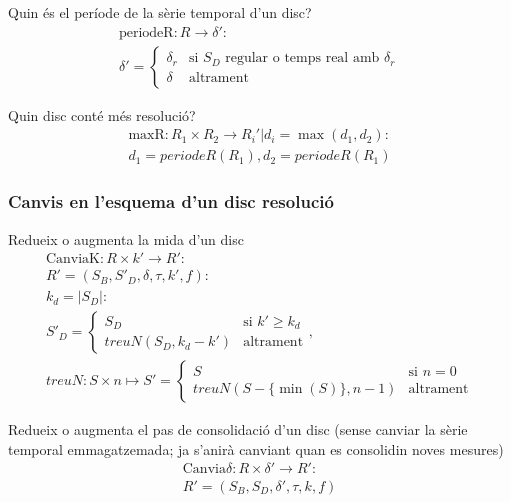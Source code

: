 Quin és el període de la sèrie temporal d'un disc?
  \begin{gather*}
    \text{periodeR}: R \longrightarrow \delta':\\
    \delta'=
    \begin{cases}
      \delta_r &\text{si } S_D \text{ regular o temps real amb } \delta_r\\
      \delta &\text{altrament}
    \end{cases}
  \end{gather*}


Quin disc conté més resolució?
  \begin{gather*}
    \text{maxR}: R_1 \times R_2 \longrightarrow R_i' | d_i = \max(d_1,d_2) : \\
    d_1 = periodeR(R_1), d_2 = periodeR(R_1)
  \end{gather*}



\subsubsection{Canvis en l'esquema d'un disc resolució}


Redueix o augmenta la mida d'un disc
  \begin{gather*}
    \text{CanviaK}: R \times k' \longrightarrow R': \\
    R' = (S_B,S'_D,\delta,\tau,k',f) : \\
    k_d = |S_D|:\\
    S'_D = \begin{cases}
      S_D         & \text{si } k' \geq k_d   \\
      treuN(S_D,k_d-k')    & \text{altrament}
    \end{cases}, \\
    treuN: S \times n \mapsto S'=  
    \begin{cases}
      S                & \text{si } n=0   \\
      treuN(S - \{\min(S)\},n-1)  & \text{altrament}
    \end{cases}
\end{gather*}


Redueix o augmenta el pas de consolidació d'un disc (sense canviar la sèrie temporal emmagatzemada; ja s'anirà canviant quan es consolidin noves mesures)
  \begin{gather*}
    \text{Canvia}\delta: R \times \delta' \longrightarrow R': \\
    R' = (S_B,S_D,\delta',\tau,k,f)
  \end{gather*}


